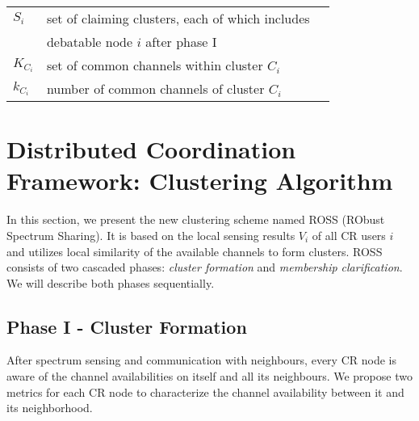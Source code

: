 \begin{table}[ht!]
\begin{tabular}{llr}
$S_i$ & set of claiming clusters, each of which includes \\
& debatable node $i$ after phase I\\
$K_{C_i}$ & set of common channels within cluster $C_i$\\
$k_{C_i}$ & number of common channels of cluster $C_i$\\
\bottomrule
\end{tabular}
\end{table}





\section{Distributed Coordination Framework: Clustering Algorithm}
\label{ross}



In this section, we present the new clustering scheme named \gls{ROSS} (RObust Spectrum Sharing). It is based on the local sensing results $V_{i}$ of all CR users $i$ and utilizes local similarity of the available channels to form clusters. ROSS consists of two cascaded phases: \textit{cluster formation} and \textit{membership clarification}. We will describe both phases sequentially.

\subsection{Phase I - Cluster Formation}
After spectrum sensing and communication with neighbours, every CR node is aware of the channel availabilities on itself and all its neighbours.
We propose two metrics for each CR node to characterize the channel availability between it and its neighborhood.

